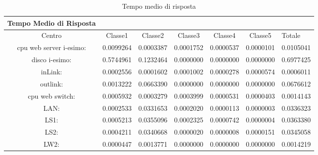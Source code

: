 \begin{table}[htbp]
\begin{center}
\begin{tabular}{||c|c|c|c|c|c||}
\hline
Tempo Medio di Risposta\\
\hline
Centro &Classe1 &Classe2 &Classe3 &Classe4 &Classe5 &Totale\\
\hline
\hline
 cpu web server i-esimo: 	&0.0099264	&0.0003387	&0.0001752	&0.0000537	&0.0000101	&0.0105041\\
\hline
 disco i-esimo: 	&0.5744961	&0.1232464	&0.0000000	&0.0000000	&0.0000000	&0.6977425\\
\hline
 inLink: 	&0.0002556	&0.0001602	&0.0001002	&0.0000278	&0.0000574	&0.0006011\\
\hline
 outlink: 	&0.0013222	&0.0663390	&0.0000000	&0.0000000	&0.0000000	&0.0676612\\
\hline
 cpu web switch: 	&0.0005932	&0.0003279	&0.0003999	&0.0000531	&0.0000403	&0.0014143\\
\hline
 LAN: 	&0.0002533	&0.0331653	&0.0002020	&0.0000113	&0.0000003	&0.0336323\\
\hline
 LS1: 	&0.0005213	&0.0355096	&0.0002325	&0.0000742	&0.0000004	&0.0363380\\
\hline
 LS2: 	&0.0004211	&0.0340668	&0.0000020	&0.0000008	&0.0000151	&0.0345058\\
\hline
 LW2: 	&0.0000447	&0.0013771	&0.0000000	&0.0000000	&0.0000000	&0.0014219\\
\hline
\end{tabular}
\end{center}
\caption{Tempo medio di risposta}
\label{tempomediorisposta}
\end{table}

